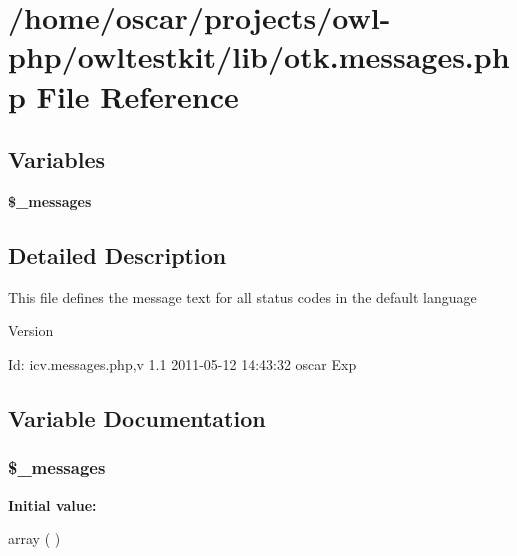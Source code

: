 \section{/home/oscar/projects/owl-\/php/owltestkit/lib/otk.messages.php File Reference}
\label{otk_8messages_8php}
\subsection*{Variables}
\begin{DoxyCompactItemize}
\item 
{\bf \$\_\-messages}
\end{DoxyCompactItemize}


\subsection{Detailed Description}
This file defines the message text for all status codes in the default language \begin{DoxyVersion}{Version}

\end{DoxyVersion}
\begin{DoxyParagraph}{Id:}
icv.messages.php,v 1.1 2011-\/05-\/12 14:43:32 oscar Exp 
\end{DoxyParagraph}


\subsection{Variable Documentation}
\subsubsection[{\$\_\-messages}]{\setlength{\rightskip}{0pt plus 5cm}\$\_\-messages}\label{otk_8messages_8php_a5caca00ffca4d529cdbb748a61f4b015}
{\bfseries Initial value:}
\begin{DoxyCode}
 array (
)
\end{DoxyCode}
